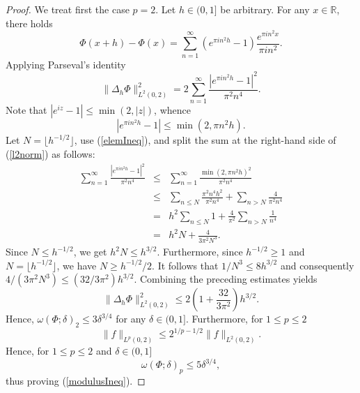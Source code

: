 \documentclass{amsart}
\numberwithin{equation}{section}
\begin{document}
\begin{proof}
We treat first the case $p=2$. Let $h\in(0,1]$ be arbitrary. For any $x\in\mathbb{R}$, there holds
\begin{equation}
    \nonumber
    \Phi(x+h)-\Phi(x)=\sum_{n=1}^\infty(e^{\pi i n^2h}-1)\frac{e^{\pi i n^2 x}}{\pi in^2}.
\end{equation}
Applying Parseval's identity
\begin{equation}
    \label{l2norm}
    \|\Delta_h\Phi\|^2_{L^2(0,2)}=2\sum_{n=1}^\infty\frac{|e^{\pi i n^2h}-1|^2}{\pi^2 n^4}.
\end{equation}
Note that $|e^{iz}-1|\le\min(2,|z|)$, whence
\begin{equation}
    \label{elemIneq}
    |e^{\pi i n^2h}-1|\le\min(2,\pi n^2h).
\end{equation}
Let $N=\lfloor h^{-1/2}\rfloor$, use (\ref{elemIneq}), and split the sum at the right-hand side of (\ref{l2norm}) as follows:
\begin{eqnarray}
    \nonumber
    \sum_{n=1}^\infty\frac{|e^{\pi i n^2h}-1|^2}{\pi^2 n^4}&\le&\sum_{n=1}^\infty\frac{\min(2,\pi n^2h)^2}{\pi^2n^4}\\
    \nonumber
    &\le &\sum_{n\le N}\frac{\pi^2 n^4h^2}{\pi^2 n^4}+\sum_{n> N}\frac{4}{\pi^2 n^4}\\
    \nonumber
    &=&h^2\sum_{n\le N}1+\frac{4}{\pi^2}\sum_{n> N}\frac{1}{n^4}\\
    \nonumber
    &=& h^2N+\frac{4}{3\pi^2N^3}.
\end{eqnarray}
Since $N\le h^{-1/2}$, we get $h^2N\le h^{3/2}$. Furthermore, since $h^{-1/2}\ge1$ and $N=\lfloor h^{-1/2}\rfloor$, we have $N\ge h^{-1/2}/2$. It follows that $1/N^3\le 8h^{3/2}$ and consequently $4/(3\pi^2 N^3)\le (32/3\pi^2)h^{3/2}$. Combining the preceding estimates yields
\begin{equation}
    \nonumber
    \|\Delta_h\Phi\|^2_{L^2(0,2)}\le 2\left(1+\frac{32}{3\pi^2}\right)h^{3/2}.
\end{equation}
Hence, $\omega(\Phi;\delta)_2\le3\delta^{3/4}$ for any $\delta\in(0,1]$. Furthermore, for $1\le p\le 2$
\begin{equation}
    \nonumber
    \|f\|_{L^p(0,2)}\le 2^{1/p-1/2}\|f\|_{L^2(0,2)}.
\end{equation}
Hence, for $1\le p\le 2$ and $\delta\in(0,1]$
\begin{equation}
    \nonumber
    \omega(\Phi;\delta)_p\le5\delta^{3/4},
\end{equation}
thus proving (\ref{modulusIneq}).
\end{proof}
\end{document}
